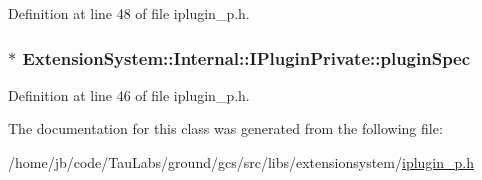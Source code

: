 \-Definition at line 48 of file iplugin\-\_\-p.\-h.

\hypertarget{class_extension_system_1_1_internal_1_1_i_plugin_private_a377dc83eb6f39dfa7a57a0530c064d57}{
\subsubsection[{plugin\-Spec}]{$\ast$ {\bf \-Extension\-System\-::\-Internal\-::\-I\-Plugin\-Private\-::plugin\-Spec}}}\label{class_extension_system_1_1_internal_1_1_i_plugin_private_a377dc83eb6f39dfa7a57a0530c064d57}


\-Definition at line 46 of file iplugin\-\_\-p.\-h.



\-The documentation for this class was generated from the following file\-:\begin{DoxyCompactItemize}
\item 
/home/jb/code/\-Tau\-Labs/ground/gcs/src/libs/extensionsystem/\hyperlink{iplugin__p_8h}{iplugin\-\_\-p.\-h}\end{DoxyCompactItemize}
